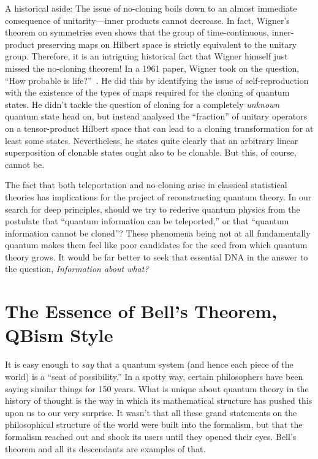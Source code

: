\documentclass[aps,pra,superscriptaddress,10pt,tightenlines,twocolumn,nofootinbib]{revtex4}
\begin{document}
A historical aside:  The issue of no-cloning boils down to an almost immediate consequence of unitarity---inner products cannot decrease.  In fact, Wigner's theorem on symmetries \cite{Wigner12} even shows that the group of time-continuous, inner-product preserving maps on Hilbert space is strictly equivalent to the unitary group.  Therefore, it is an intriguing historical fact that Wigner himself just missed the no-cloning theorem!  In a 1961 paper, Wigner took on the question, ``How probable is life?''~\cite{Wigner61}. He did this by identifying the issue of self-reproduction with the existence of the types of maps required for the cloning of quantum states.  He didn't tackle the question of cloning for a completely {\it unknown\/} quantum state head on, but instead analysed the ``fraction'' of unitary operators on a tensor-product Hilbert space that can lead to a cloning transformation for at least some states.  Nevertheless, he states quite clearly that an arbitrary linear superposition of clonable states ought also to be clonable. But this, of course, cannot be.

The fact that both teleportation and no-cloning arise in classical statistical theories has implications for the project of reconstructing quantum theory.  In our search for deep principles, should we try to rederive quantum physics from the postulate that ``quantum information can be teleported,'' or that ``quantum information cannot be cloned''?  These phenomena being not at all fundamentally quantum makes them feel like poor candidates for the seed from which quantum theory grows.  It would be far better to seek that essential DNA in the answer to the question, {\it Information about what?}

\section{The Essence of Bell's Theorem, QBism Style}

\label{BellTheorem}

It is easy enough to {\it say\/} that a quantum system (and hence each piece of the world) is a ``seat of possibility.''  In a spotty way, certain philosophers have been saying similar things for 150 years.  What is unique about quantum theory in the history of thought is the way in which its mathematical structure has pushed this upon us to our very surprise.  It wasn't that all these grand statements on the philosophical structure of the world were built into the formalism, but that the formalism reached out and shook its users until they opened their eyes.  Bell's theorem and all its descendants are examples of that.
\end{document}

